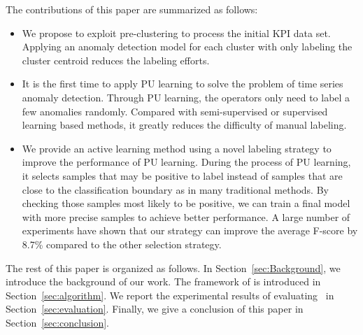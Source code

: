 The contributions of this paper are summarized as follows:
\begin{itemize}
  \item 
  We propose to 
  exploit pre-clustering to process the initial KPI data set. %
  Applying an anomaly detection model for each cluster with only labeling the cluster centroid reduces the labeling efforts. 
  \item  
  It is the first time to apply PU learning to solve the problem of time series anomaly detection. Through PU learning, the operators only need to label a few anomalies randomly. Compared with semi-supervised or supervised learning based methods, it greatly reduces the difficulty of manual labeling.
  \item
  We provide an active learning method using a novel labeling strategy to improve the performance of PU learning. During the process of PU learning, it selects samples that may be positive to label instead of samples that are close to the classification boundary as in many traditional methods. By checking those samples most likely to be positive, we can train a final model with more precise samples to achieve better performance. A large number of experiments have shown that our strategy can improve the average F-score by 8.7\% compared to the other selection strategy. 
  
\end{itemize}

The rest of this paper is organized as follows. In Section~\ref{sec:Background}, we introduce the background of our work. The framework of \name{} is introduced in Section~\ref{sec:algorithm}. We report the experimental results of evaluating~\name{} in Section~\ref{sec:evaluation}. Finally, we give a conclusion of this paper in Section~\ref{sec:conclusion}.
